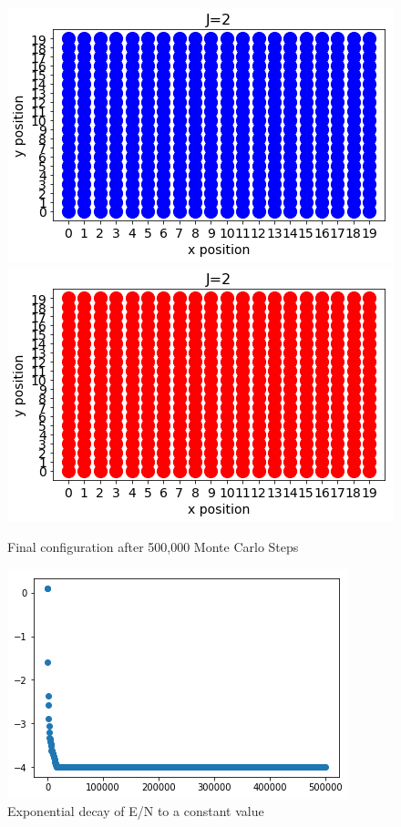 \documentclass{article}
\begin{document}
	\begin{figure}[H]
		\centering
		\includegraphics[scale=0.5]{J=2a}
		\includegraphics[scale=0.5]{J=2b}
		\caption{Final configuration after 500,000 Monte Carlo Steps}
	\end{figure}

	\begin{figure}[H]
		\centering
		\includegraphics[scale=0.75]{J=2c}
		\caption{Exponential decay of E/N to a constant value}
	\end{figure}
\end{document}
